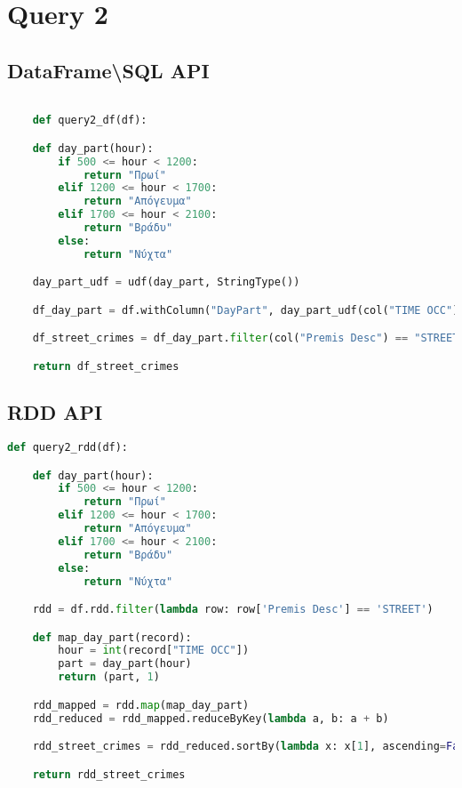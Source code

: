 \documentclass{article}
\begin{document}
\section*{Query 2}

\subsection*{DataFrame\textbackslash SQL  API}

\begin{lstlisting}[language = Python]

    def query2_df(df):

    def day_part(hour):
        if 500 <= hour < 1200:
            return "Πρωί"
        elif 1200 <= hour < 1700:
            return "Απόγευμα"
        elif 1700 <= hour < 2100:
            return "Βράδυ"
        else:
            return "Νύχτα"

    day_part_udf = udf(day_part, StringType())

    df_day_part = df.withColumn("DayPart", day_part_udf(col("TIME OCC")))

    df_street_crimes = df_day_part.filter(col("Premis Desc") == "STREET").groupBy("DayPart").count().orderBy(col("count").desc())

    return df_street_crimes
\end{lstlisting}

\subsection*{RDD API}

\begin{lstlisting}[language = Python]
    def query2_rdd(df):

    def day_part(hour):
        if 500 <= hour < 1200:
            return "Πρωί"
        elif 1200 <= hour < 1700:
            return "Απόγευμα"
        elif 1700 <= hour < 2100:
            return "Βράδυ"
        else:
            return "Νύχτα"

    rdd = df.rdd.filter(lambda row: row['Premis Desc'] == 'STREET')

    def map_day_part(record):
        hour = int(record["TIME OCC"])
        part = day_part(hour)
        return (part, 1)

    rdd_mapped = rdd.map(map_day_part)
    rdd_reduced = rdd_mapped.reduceByKey(lambda a, b: a + b)

    rdd_street_crimes = rdd_reduced.sortBy(lambda x: x[1], ascending=False)

    return rdd_street_crimes 
\end{lstlisting}
\end{document}
